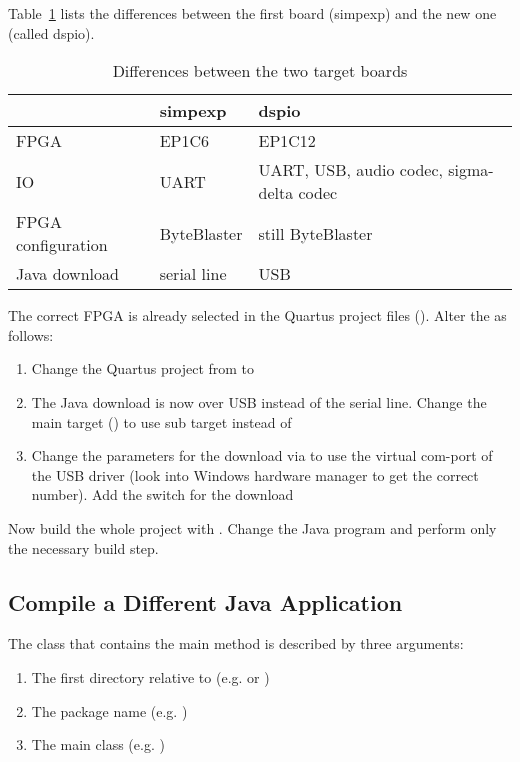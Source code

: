 Table~\ref{tab:boards} lists the  differences between the first
board (simpexp) and the new one (called dspio).
%
\begin{table}
    \centering

\begin{tabular}{lll}
    \toprule
       & simpexp & dspio \\
    \midrule
    FPGA & EP1C6 & EP1C12 \\
    IO & UART & UART, USB, audio codec, sigma-delta codec \\
    FPGA configuration & ByteBlaster & still ByteBlaster \\
    Java download & serial line & USB \\

    \bottomrule

\end{tabular}
    \caption{Differences between the two target boards}
    \label{tab:boards}

\end{table}
%
The correct FPGA is already selected in the Quartus project files
(). Alter the  as follows:

\begin{enumerate}
    \item Change the Quartus project from  to
    \item The Java download is now over USB instead of the serial
    line. Change the main target () to use sub target
     instead of 
    \item Change the parameters for the download via 
    to use the virtual com-port of the USB driver (look into Windows
    hardware manager to get the correct number). Add the switch
     for the download
\end{enumerate}

Now build the whole project with . Change the Java
program and perform only the necessary build step.

\subsection{Compile a Different Java Application}

The class that contains the main method is described by three
arguments:
\begin{enumerate}
    \item The first directory relative to 
    (e.g.  or )
    \item The package name (e.g. )
    \item The main class (e.g. )
\end{enumerate}


